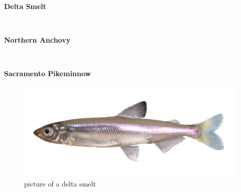 \documentclass[
]{book}
\begin{document}
\begin{panel-grid}

\begin{columns-nocenter}

\begin{column800}

\textbf{Delta Smelt}

\end{column800}

\begin{column40}

~

\end{column40}

\begin{column800}

\textbf{Northern Anchovy}

\end{column800}

\begin{column40}

~

\end{column40}

\begin{column800}

\textbf{Sacramento Pikeminnow}

\end{column800}

\end{columns-nocenter}

\begin{columns-nocenter}

\begin{column800}

\begin{figure}

{\centering \includegraphics[width=29.17in]{figures/delta_smelt} 

}

\caption{picture of a delta smelt}\label{fig:unnamed-chunk-76}
\end{figure}


\end{column800}
\end{columns-nocenter}
\end{panel-grid}
\end{document}
